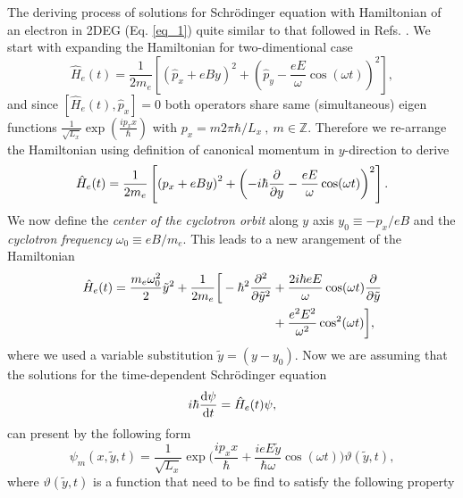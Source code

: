 The deriving process of solutions for Schrödinger equation with Hamiltonian of an electron in 2DEG (Eq. \ref{eq_1}) quite similar to that followed in Refs. \cite{husmi53,dini16}. We start with expanding the Hamiltonian for two-dimentional case
\begin{equation} \label{eq_a1}
  \hat{H}_e(t) = \frac{1}{2m_e}\left[
    \left(\hat{p}_x + eBy \right)^2 +
    \left(\hat{p}_y - \frac{eE}{\omega}\cos(\omega t)\right)^2
  \right],
\end{equation}
and since $\left[\hat{H}_e(t),\hat{p}_x \right] =0$ both operators share same (simultaneous) eigen functions
$\frac{1}{\sqrt{L_x}}\exp(\frac{ip_x x}{\hbar})$ with $p_x = m2\pi \hbar/L_x~,~ m \in \mathbb{Z}$.
Therefore we re-arrange the Hamiltonian using definition of canonical momentum in $y$-direction to derive
\begin{equation} \label{eq_a2}
    \hat{H}_e(t) = \frac{1}{2m_e}\left[
      \left({p}_x + eBy \right)^2 +
      \left(-i\hbar \pdv{y}- \frac{eE}{\omega}\cos(\omega t)\right)^2
    \right].
\end{equation}
We now define the \textit{center of the cyclotron orbit} along $y$ axis $y_0 \equiv {-p_x}/{eB}$ and the \textit{cyclotron frequency} $\omega_0 \equiv {eB}/{m_e}$. This leads to a new arangement of the Hamiltonian
\begin{equation} \label{eq_a3}
  \begin{aligned}
    \hat{H}_e(t) =
      \frac{m_e \omega_0^2}{2}\tilde{y}^2 +
      \frac{1}{2m_e}\bigg[
      -\hbar^2 \pdv[2]{\tilde{y}} & +
      \frac{2i\hbar eE}{\omega}\cos(\omega t) \pdv{\tilde{y}} \\
      & +
      \frac{e^2E^2}{\omega^2}\cos[2](\omega t)
      \bigg],
  \end{aligned}
\end{equation}
where we used a variable substitution $\tilde{y} = (y - y_0)$. Now we are assuming that the solutions for the time-dependent Schrödinger equation
\begin{equation} \label{eq_a4}
    i \hbar \dv{\psi}{t} = \hat{H}_e(t)\psi,
\end{equation}
can present by the following form
\begin{equation} \label{eq_a5}
    \psi_m(x,\tilde{y},t) = \frac{1}{\sqrt{L_x}} \exp\bigg(
      \frac{ip_x x}{\hbar} +
      \frac{ieE\tilde{y}}{\hbar \omega}\cos(\omega t)
    \bigg) \vartheta(\tilde{y},t),
\end{equation}
where $\vartheta(\tilde{y},t)$ is a function that need to be find to satisfy the following property

